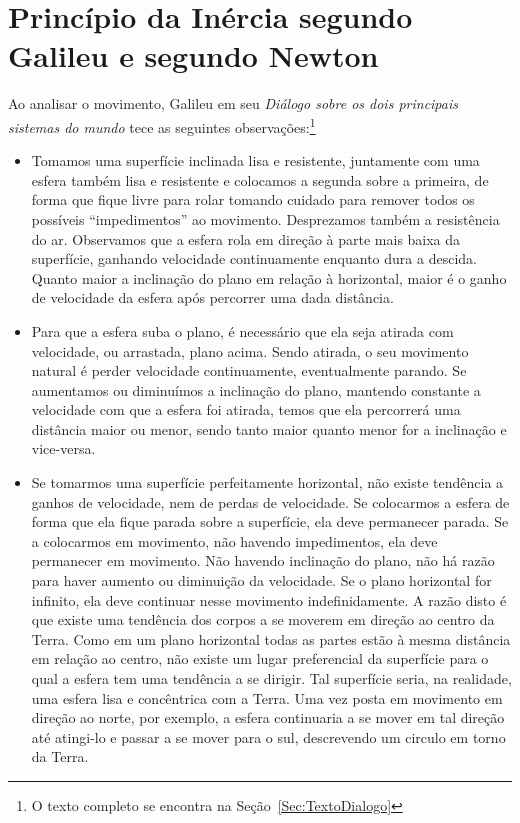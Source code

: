 \section{Princípio da Inércia segundo Galileu e segundo Newton}

Ao analisar o movimento, Galileu em seu \emph{Diálogo sobre os dois principais sistemas do mundo} tece as seguintes observações:\footnote{O texto completo se encontra na Seção~\ref{Sec:TextoDialogo}}
\begin{itemize}
  \item Tomamos uma superfície inclinada lisa e resistente, juntamente com uma esfera também lisa e resistente e colocamos a segunda sobre a primeira, de forma que fique livre para rolar tomando cuidado para remover todos os possíveis ``impedimentos'' ao movimento. Desprezamos também a resistência do ar. Observamos que a esfera rola em direção à parte mais baixa da superfície, ganhando velocidade continuamente enquanto dura a descida. Quanto maior a inclinação do plano em relação à horizontal, maior é o ganho de velocidade da esfera após percorrer uma dada distância.
  \item Para que a esfera suba o plano, é necessário que ela seja atirada com velocidade, ou arrastada, plano acima. Sendo atirada, o seu movimento natural é perder velocidade continuamente, eventualmente parando. Se aumentamos ou diminuímos a inclinação do plano, mantendo constante a velocidade com que a esfera foi atirada, temos que ela percorrerá uma distância maior ou menor, sendo tanto maior quanto menor for a inclinação e vice-versa.
  \item Se tomarmos uma superfície perfeitamente horizontal, não existe tendência a ganhos de velocidade, nem de perdas de velocidade. Se colocarmos a esfera de forma que ela fique parada sobre a superfície, ela deve permanecer parada. Se a colocarmos em movimento, não havendo impedimentos, ela deve permanecer em movimento. Não havendo inclinação do plano, não há razão para haver aumento ou diminuição da velocidade. Se o plano horizontal for infinito, ela deve continuar nesse movimento indefinidamente. A razão disto é que existe uma tendência dos corpos a se moverem em direção ao centro da Terra. Como em um plano horizontal todas as partes estão à mesma distância em relação ao centro, não existe um lugar preferencial da superfície para o qual a esfera tem uma tendência a se dirigir. Tal superfície seria, na realidade, uma esfera lisa e concêntrica com a Terra. Uma vez posta em movimento em direção ao norte, por exemplo, a esfera continuaria a se mover em tal direção até atingi-lo e passar a se mover para o sul, descrevendo um circulo em torno da Terra.
\end{itemize}
